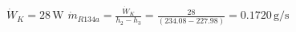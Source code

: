 \( \dot{W}_K = 28 \, \text{W} \)  
\( \dot{m}_{R134a} = \frac{\dot{W}_K}{h_2 - h_3} = \frac{28}{(234.08 - 227.98)} = 0.1720 \, \text{g/s} \)